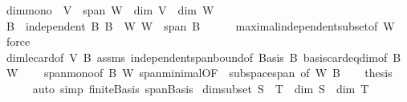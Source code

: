 \begin{isabellebody}
\endisatagproof
{\isafoldproof}%
%
\isadelimproof
\isanewline
%
\endisadelimproof
\isanewline
{}\isamarkupfalse%
\ dim{\isacharunderscore}{\kern0pt}mono{\isacharcolon}{\kern0pt}\ \ {\isachardoublequoteopen}V\ {\isasymsubseteq}\ span\ W{\isachardoublequoteclose}\ \ {\isachardoublequoteopen}dim\ V\ {\isasymle}\ dim\ W{\isachardoublequoteclose}\isanewline
%
\isadelimproof
%
\endisadelimproof
%
\isatagproof
{}\isamarkupfalse%
\ {\isacharminus}{\kern0pt}\isanewline
\ \ \isamarkupfalse%
\ B\ \ {\isachardoublequoteopen}independent\ B{\isachardoublequoteclose}\ {\isachardoublequoteopen}B\ {\isasymsubseteq}\ W{\isachardoublequoteclose}\ {\isachardoublequoteopen}W\ {\isasymsubseteq}\ span\ B{\isachardoublequoteclose}\isanewline
\ \ \ \ \isamarkupfalse%
\ maximal{\isacharunderscore}{\kern0pt}independent{\isacharunderscore}{\kern0pt}subset{\isacharbrackleft}{\kern0pt}of\ W{\isacharbrackright}{\kern0pt}\ \isamarkupfalse%
\ force\isanewline
\ \ \isamarkupfalse%
\ dim{\isacharunderscore}{\kern0pt}le{\isacharunderscore}{\kern0pt}card{\isacharbrackleft}{\kern0pt}of\ V\ B{\isacharbrackright}{\kern0pt}\ assms\ independent{\isacharunderscore}{\kern0pt}span{\isacharunderscore}{\kern0pt}bound{\isacharbrackleft}{\kern0pt}of\ Basis\ B{\isacharbrackright}{\kern0pt}\ basis{\isacharunderscore}{\kern0pt}card{\isacharunderscore}{\kern0pt}eq{\isacharunderscore}{\kern0pt}dim{\isacharbrackleft}{\kern0pt}of\ B\ W{\isacharbrackright}{\kern0pt}\isanewline
\ \ \ \ span{\isacharunderscore}{\kern0pt}mono{\isacharbrackleft}{\kern0pt}of\ B\ W{\isacharbrackright}{\kern0pt}\ span{\isacharunderscore}{\kern0pt}minimal{\isacharbrackleft}{\kern0pt}OF\ {\isacharunderscore}{\kern0pt}\ subspace{\isacharunderscore}{\kern0pt}span{\isacharcomma}{\kern0pt}\ of\ W\ B{\isacharbrackright}{\kern0pt}\isanewline
\ \ \isamarkupfalse%
\ {\isacharquery}{\kern0pt}thesis\isanewline
\ \ \ \ \isamarkupfalse%
\ {\isacharparenleft}{\kern0pt}auto\ simp{\isacharcolon}{\kern0pt}\ finite{\isacharunderscore}{\kern0pt}Basis\ span{\isacharunderscore}{\kern0pt}Basis{\isacharparenright}{\kern0pt}\isanewline
{}\isamarkupfalse%
%
\endisatagproof
{\isafoldproof}%
%
\isadelimproof
\isanewline
%
\endisadelimproof
\isanewline
{}\isamarkupfalse%
\ dim{\isacharunderscore}{\kern0pt}subset{\isacharcolon}{\kern0pt}\ {\isachardoublequoteopen}S\ {\isasymsubseteq}\ T\ {\isasymLongrightarrow}\ dim\ S\ {\isasymle}\ dim\ T{\isachardoublequoteclose}\isanewline

\end{isabellebody}
